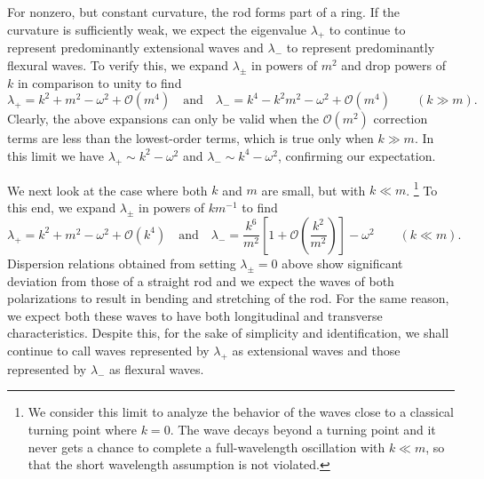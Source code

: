 For nonzero, but constant curvature, the rod forms part of a ring.
If the curvature is sufficiently weak, we expect the eigenvalue $\lambda_{+}$ to continue to represent predominantly extensional waves and $\lambda_{-}$ to represent predominantly flexural waves.
To verify this, we expand $\lambda_{\pm}$ in powers of $m^{2}$ and drop powers of $k$ in comparison to unity to find
%
\begin{equation}
  \lambda_{+} = k^{2} + m^{2} - \omega^{2} + \mathcal{O}(m^{4})
  \quad\text{and}\quad
  \lambda_{-} = k^{4} - k^{2}m^{2} - \omega^{2} + \mathcal{O}(m^{4})
  \qquad{(k \gg m)}.
  \label{eq:rod_kgm}
\end{equation}
%
Clearly, the above expansions can only be valid when the $\mathcal{O}(m^{2})$ correction terms are less than the lowest-order terms, which is true only when $k \gg m$.
In this limit we have $\lambda_{+} \sim k^{2} - \omega^{2}$ and $\lambda_{-} \sim k^{4} - \omega^{2}$, confirming our expectation.

We next look at the case where both $k$ and $m$ are small, but with $k \ll m$.%
\footnote{%
  We consider this limit to analyze the behavior of the waves close to a classical turning point where $k = 0$.
  The wave decays beyond a turning point and it never gets a chance to complete a full-wavelength oscillation with $k \ll m$, so that the short wavelength assumption is not violated.
}
To this end, we expand $\lambda_{\pm}$ in powers of $km^{-1}$ to find
%
\begin{equation}
  \lambda_{+} = k^{2} + m^{2} - \omega^{2} + \mathcal{O}(k^{4})
  \quad\text{and}\quad
  \lambda_{-} = \frac{k^{6}}{m^{2}}\left[1 + \mathcal{O}\left(\frac{k^{2}}{m^{2}}\right)\right] - \omega^{2}
  \qquad{(k \ll m)}.
  \label{eq:rod_klm}
\end{equation}
%
Dispersion relations obtained from setting $\lambda_{\pm} = 0$ above show significant deviation from those of a straight rod and we expect the waves of both polarizations to result in bending and stretching of the rod.
For the same reason, we expect both these waves to have both longitudinal and transverse characteristics.
Despite this, for the sake of simplicity and identification, we shall continue to call waves represented by $\lambda_{+}$ as extensional waves and those represented by $\lambda_{-}$ as flexural waves.

